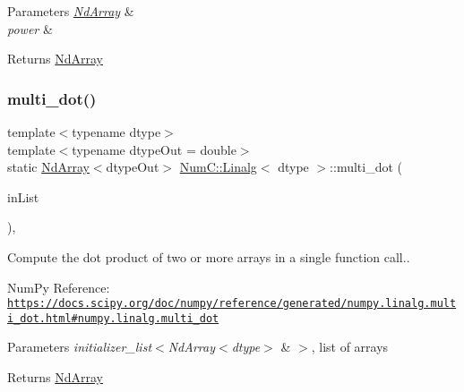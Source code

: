 \begin{DoxyParams}{Parameters}
{\em \mbox{\hyperlink{class_num_c_1_1_nd_array}{Nd\+Array}}} & \\
\hline
{\em power} & \\
\hline
\end{DoxyParams}
\begin{DoxyReturn}{Returns}
\mbox{\hyperlink{class_num_c_1_1_nd_array}{Nd\+Array}} 
\end{DoxyReturn}
\mbox{\label{class_num_c_1_1_linalg_a27f2745847b1685b2ebe6ca030174528}} 
\subsubsection{\texorpdfstring{multi\+\_\+dot()}{multi\_dot()}}
{\footnotesize\ttfamily template$<$typename dtype$>$ \\
template$<$typename dtype\+Out  = double$>$ \\
static \mbox{\hyperlink{class_num_c_1_1_nd_array}{Nd\+Array}}$<$dtype\+Out$>$ \mbox{\hyperlink{class_num_c_1_1_linalg}{Num\+C\+::\+Linalg}}$<$ dtype $>$\+::multi\+\_\+dot (\begin{DoxyParamCaption}\item[{const std\+::initializer\+\_\+list$<$ \mbox{\hyperlink{class_num_c_1_1_nd_array}{Nd\+Array}}$<$ dtype $>$ $>$ \&}]{in\+List }\end{DoxyParamCaption})\hspace{0.3cm}{\ttfamily [inline]}, {\ttfamily [static]}}

Compute the dot product of two or more arrays in a single function call..

Num\+Py Reference\+: \href{https://docs.scipy.org/doc/numpy/reference/generated/numpy.linalg.multi_dot.html#numpy.linalg.multi_dot}{\tt https\+://docs.\+scipy.\+org/doc/numpy/reference/generated/numpy.\+linalg.\+multi\+\_\+dot.\+html\#numpy.\+linalg.\+multi\+\_\+dot}


\begin{DoxyParams}{Parameters}
{\em initializer\+\_\+list$<$\+Nd\+Array$<$dtype$>$} & $>$, list of arrays\\
\hline
\end{DoxyParams}
\begin{DoxyReturn}{Returns}
\mbox{\hyperlink{class_num_c_1_1_nd_array}{Nd\+Array}} 
\end{DoxyReturn}
\mbox{\label{class_num_c_1_1_linalg_ad7d0c5294d6c7e869ebba12d10519645}} 
